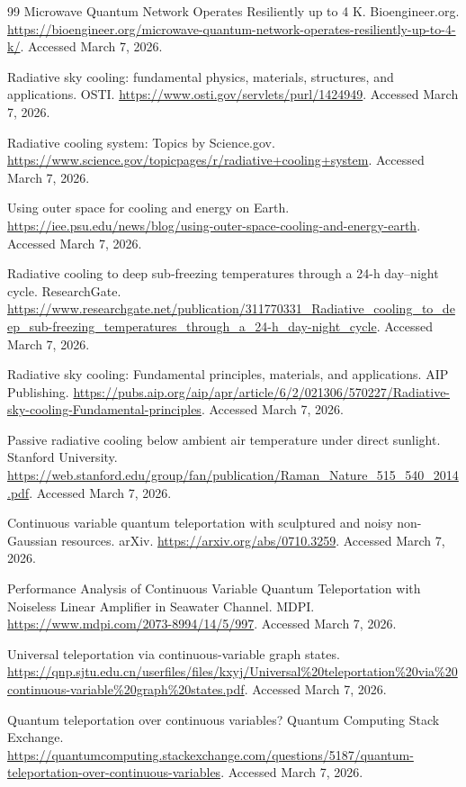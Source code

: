 \documentclass[11pt,a4paper]{article}
\begin{document}
\begin{thebibliography}{99}
 Microwave Quantum Network Operates Resiliently up to 4 K. Bioengineer.org. \url{https://bioengineer.org/microwave-quantum-network-operates-resiliently-up-to-4-k/}. Accessed March 7, 2026.

 Radiative sky cooling: fundamental physics, materials, structures, and applications. OSTI. \url{https://www.osti.gov/servlets/purl/1424949}. Accessed March 7, 2026.

 Radiative cooling system: Topics by Science.gov. \url{https://www.science.gov/topicpages/r/radiative+cooling+system}. Accessed March 7, 2026.

 Using outer space for cooling and energy on Earth. \url{https://iee.psu.edu/news/blog/using-outer-space-cooling-and-energy-earth}. Accessed March 7, 2026.

 Radiative cooling to deep sub-freezing temperatures through a 24-h day--night cycle. ResearchGate. \url{https://www.researchgate.net/publication/311770331_Radiative_cooling_to_deep_sub-freezing_temperatures_through_a_24-h_day-night_cycle}. Accessed March 7, 2026.

 Radiative sky cooling: Fundamental principles, materials, and applications. AIP Publishing. \url{https://pubs.aip.org/aip/apr/article/6/2/021306/570227/Radiative-sky-cooling-Fundamental-principles}. Accessed March 7, 2026.

 Passive radiative cooling below ambient air temperature under direct sunlight. Stanford University. \url{https://web.stanford.edu/group/fan/publication/Raman_Nature_515_540_2014.pdf}. Accessed March 7, 2026.

 Continuous variable quantum teleportation with sculptured and noisy non-Gaussian resources. arXiv. \url{https://arxiv.org/abs/0710.3259}. Accessed March 7, 2026.

 Performance Analysis of Continuous Variable Quantum Teleportation with Noiseless Linear Amplifier in Seawater Channel. MDPI. \url{https://www.mdpi.com/2073-8994/14/5/997}. Accessed March 7, 2026.

 Universal teleportation via continuous-variable graph states. \url{https://qnp.sjtu.edu.cn/userfiles/files/kxyj/Universal\%20teleportation\%20via\%20continuous-variable\%20graph\%20states.pdf}. Accessed March 7, 2026.

 Quantum teleportation over continuous variables? Quantum Computing Stack Exchange. \url{https://quantumcomputing.stackexchange.com/questions/5187/quantum-teleportation-over-continuous-variables}. Accessed March 7, 2026.


\end{thebibliography}
\end{document}
